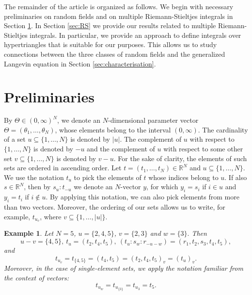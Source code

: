 \documentclass[english, a4paper, 12pt,reqno]{amsart}
\newtheorem{ex}[defi]{Example}
\begin{document}
The remainder of the article is organized as follows. We begin with necessary preliminaries on random fields and on multiple Riemann-Stieltjes integrals in Section \ref{sec:preliminaries}. In Section \ref{sec:RS} we provide our results related to multiple Riemann-Stieltjes integrals. In particular, we provide an approach to define integrals over hypertriangles that is suitable for our purposes. This allows us to study connections between the three classes of random fields and the generalized Langevin equation in Section \ref{sec:characterisation}. 

\section{Preliminaries}
\label{sec:preliminaries}
By $\Theta\in(0,\infty)^N$, we denote an $N$-dimensional parameter vector $\Theta = (\theta_1,\dots, \theta_N)$, whose elements belong to the interval $(0,\infty)$. The cardinality of a set $u\subseteq \{1,\dots,N\}$ is denoted by $|u|$. The complement of $u$ with respect to $\{1,\dots,N\}$ is denoted by $-u$ and the complement of $u$ with respect to some other set $v\subseteq \{1,\dots,N\}$ is denoted by $v-u$. For the sake of clarity, the elements of such sets are ordered in ascending order. Let $t= (t_1,\dots,t_N)\in\mathbb{R}^N$ and $u\subseteq \{1,\dots,N\}$. We use the notation $t_u$ to pick the elements of $t$ whose indices belong to $u$. If also $s\in\mathbb{R}^N$, then by $s_u:t_{-u}$ we denote an $N$-vector $y$, for which $y_i = s_i$ if $i\in u$ and $y_i = t_i$ if $i\notin u$. By applying this notation, we can also pick elements from more than two vectors. Moreover, the ordering of our sets allows us to write, for example, $t_{u_v}$, where $v \subseteq \{1,\dots,|u|\}.$

\begin{ex}
Let $N = 5$, $u = \{2,4,5\}$, $v = \{2,3\}$ and $w = \{3\}.$ Then
$$u-v = \{4,5\},\ t_u = (t_2,t_4,t_5),\ (t_u:s_w:r_{-u-w}) = (r_1,t_2,s_3,t_4,t_5),$$
and 
$$t_{u_v} = t_{\{4,5\}} = (t_4,t_5) = (t_2,t_4,t_5)_v = (t_u)_v.$$
Moreover, in the case of single-element sets, we apply the notation familiar from the context of vectors:
$$t_{u_w} = t_{u_{\{3\}}}= t_{u_3} = t_5.$$
\end{ex}
\end{document}
